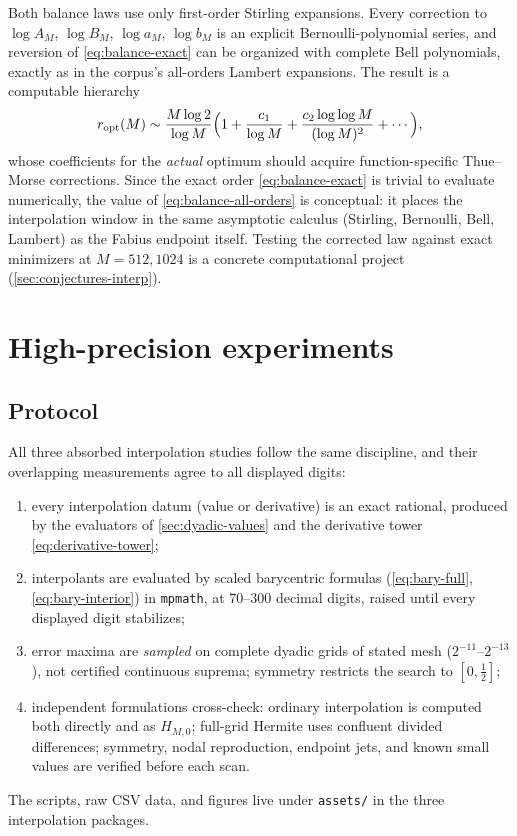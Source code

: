 \documentclass[11pt,oneside]{article}
\numberwithin{equation}{section}
\theoremstyle{definition}
\theoremstyle{remark}
\begin{document}
Both balance laws use only first-order Stirling expansions.  Every
correction to $\log A_M$, $\log B_M$, $\log a_M$, $\log b_M$ is an
explicit Bernoulli-polynomial series, and reversion of
\eqref{eq:balance-exact} can be organized with complete Bell
polynomials, exactly as in the corpus's all-orders Lambert
expansions.  The result is a computable hierarchy
\begin{equation}
 r_{\mathrm{opt}}(M)
 \sim\frac{M\log2}{\log M}
 \Bigl(1+\frac{c_1}{\log M}
 +\frac{c_2\log\log M}{(\log M)^{2}}+\cdots\Bigr),
 \label{eq:balance-all-orders}
\end{equation}
whose coefficients for the \emph{actual} optimum should acquire
function-specific Thue--Morse corrections.  Since the exact order
\eqref{eq:balance-exact} is trivial to evaluate numerically, the
value of \eqref{eq:balance-all-orders} is conceptual: it places the
interpolation window in the same asymptotic calculus (Stirling,
Bernoulli, Bell, Lambert) as the Fabius endpoint itself.  Testing the
corrected law against exact minimizers at $M=512,1024$ is a concrete
computational project (\cref{sec:conjectures-interp}).

\section{High-precision experiments}
\label{sec:numerics-interp}

\subsection{Protocol}

All three absorbed interpolation studies follow the same discipline,
and their overlapping measurements agree to all displayed digits:
\begin{enumerate}
\item every interpolation datum (value or derivative) is an exact
rational, produced by the evaluators of \cref{sec:dyadic-values} and
the derivative tower \eqref{eq:derivative-tower};
\item interpolants are evaluated by scaled barycentric formulas
(\eqref{eq:bary-full}, \eqref{eq:bary-interior}) in
\texttt{mpmath}, at $70$--$300$ decimal digits, raised until every
displayed digit stabilizes;
\item error maxima are \emph{sampled} on complete dyadic grids of
stated mesh ($2^{-11}$--$2^{-13}$), not certified continuous suprema;
symmetry restricts the search to $[0,\tfrac12]$;
\item independent formulations cross-check: ordinary interpolation is
computed both directly and as $H_{M,0}$; full-grid Hermite uses
confluent divided differences; symmetry, nodal reproduction, endpoint
jets, and known small values are verified before each scan.
\end{enumerate}
The scripts, raw CSV data, and figures live under
\nolinkurl{assets/} in the three interpolation packages.
\end{document}
